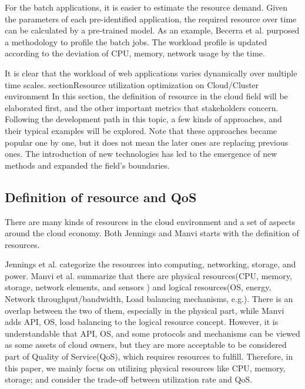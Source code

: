 \documentclass[sigchi]{acmart}
\begin{document}
For the batch applications, it is easier to estimate the resource demand. Given the parameters of each pre-identified application, the required resource over time can be calculated by a pre-trained model.
As an example, Becerra et al. purposed a methodology to profile the batch jobs. \cite{becerra2009batch} 
The workload profile is updated according  to the deviation  of CPU, memory, network usage by the time. 

It is clear that the workload of web applications varies dynamically over multiple time scales.
section{Resource utilization optimization on Cloud/Cluster environment}
In this section, the definition of resource in the cloud field will be elaborated first, and the other important metrics that stakeholders concern.
Following the development path in this topic, a few kinds of approaches, and their typical examples will be explored.
Note that these approaches became popular one by one, but it does not mean the later ones are replacing previous ones.
The introduction of new technologies has led to the emergence of new methods and expanded the field's boundaries.
\subsection{Definition of resource and QoS}
There are many kinds of resources in the cloud environment and a set of aspects around the cloud economy.
Both Jennings \cite{Jennings2015} and Manvi \cite{Manvi2014} starts with the definition of resources.

Jennings et al. categorize the resources into computing, networking, storage, and power. 
Manvi et al. summarize that there are physical resources(CPU, memory, storage, network elements, and sensors ) and logical resources(OS, energy, Network throughput/bandwidth, Load balancing mechanisms, e.g.).
There is an overlap between the two of them, especially in the physical part, while Manvi adds API, OS, load balancing to the logical resource concept.
However, it is understandable that API, OS, and some protocols and mechanisms can be viewed as some assets of cloud owners, but they are more acceptable to be considered part of Quality of Service(QoS), which requires resources to fulfill.
Therefore, in this paper, we mainly focus on utilizing physical resources like CPU, memory, storage; and consider the trade-off between utilization rate and QoS.
\end{document}
